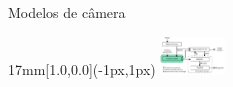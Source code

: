 \begin{frame}{Modelos de câmera}
  \begin{textblock*}{17mm}[1.0,0.0](\paperwidth-1px,1px)
    \includegraphics[width=17mm]{blocos_s2.png}
  \end{textblock*}
\end{frame}
\addtocounter{framenumber}{-1}


